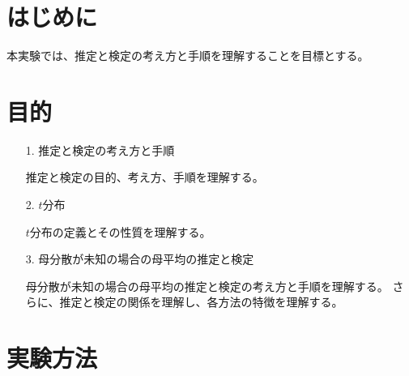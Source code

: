 \documentclass[12pt]{jarticle}
\begin{document}



\section{はじめに}

本実験では、推定と検定の考え方と手順を理解することを目標とする。

\section{目的}
\begin{itemize}
      \item [1.]推定と検定の考え方と手順

            推定と検定の目的、考え方、手順を理解する。
      \item [2.]$t$分布

            $t$分布の定義とその性質を理解する。
      \item [3.]母分散が未知の場合の母平均の推定と検定

            母分散が未知の場合の母平均の推定と検定の考え方と手順を理解する。
            さらに、推定と検定の関係を理解し、各方法の特徴を理解する。
\end{itemize}

\section{実験方法}
\end{document}

